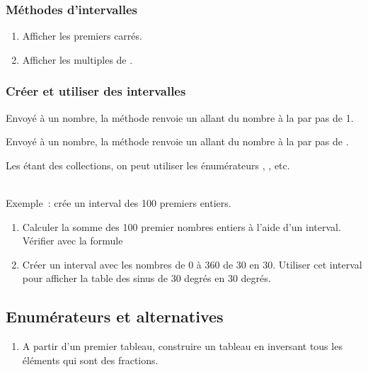 \subsubsection{M\'ethodes d'intervalles}
\begin{enumerate}
\item Afficher les  premiers carr\'es.
\item Afficher les multiples de .
\end{enumerate}

\subsubsection{Cr\'eer et utiliser des intervalles}

Envoy\'e \`a un nombre,  la m\'ethode  renvoie
un  allant du nombre \`a la 
par pas de 1.

Envoy\'e \`a un nombre,  la m\'ethode 
renvoie un  allant du nombre \`a la 
par pas de .

Les  \'etant des collections, on peut utiliser les
\'enum\'erateurs , , etc.

~\\
Exemple~:  cr\'ee un interval des 100 premiers entiers.

\begin{enumerate}
\item
Calculer la somme des 100 premier nombres entiers \`a l'aide d'un interval.
V\'erifier avec la formule 

\item
Cr\'eer un interval avec les nombres de $0$ \`a $360$ de $30$ en $30$.
Utiliser cet interval pour afficher la table des sinus de $30$ degr\'es en $30$ degr\'es.
\end{enumerate}

\subsection{Enum\'erateurs et alternatives}
\begin{enumerate}
\item A partir d'un premier tableau, construire un tableau en
inversant tous les \'el\'ements qui sont des fractions.
\end{enumerate}

